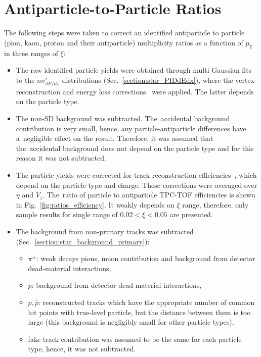 \section{Antiparticle-to-Particle Ratios}\label{section:star_ratios}
The following steps were taken to correct an  identified antiparticle to particle (pion, kaon, proton and their antiparticle) multiplicity ratios as a function of $p_\textrm{T}$ in three ranges of $\xi$:
\begin{itemize}
	\item The raw identified particle yields were obtained through multi-Gaussian fits to the $n\sigma^i_{dE/dx}$ distributions (Sec.~\ref{section:star_PIDdEdx}), where the vertex reconstruction and energy loss corrections~\cite{supplementaryNote} were applied. The latter depends on the particle type.
	\item The non-SD background was subtracted.
	The~accidental background contribution is very small, hence, any particle-antiparticle differences have a~negligible effect on the result. Therefore, 
	 it was assumed that the~accidental background does not depend on the particle type and for this reason it was not subtracted. 
	\item The particle yields were corrected for track reconstruction efficiencies~\cite{supplementaryNote}, which depend on the particle type and charge. These corrections were averaged over $\eta$ and $V_{z}$.
	The~ratio of particle to antiparticle TPC-TOF efficiencies is shown in Fig.~\ref{fig:ratios_efficiency}.  It weakly depends on $\xi$ range, therefore, only sample results for single range of $0.02<\xi<0.05$  are presented.
	\item The background from non-primary tracks was subtracted (Sec.~\ref{section:star_background_primary}):
	\begin{itemize}
		\item $\pi^\pm$: weak decays pions, muon contribution and background from  detector dead-material interactions,
		\item $p$: background from  detector dead-material interactions,
		\item $p,\bar{p}$: reconstructed tracks which have the appropriate number of common hit points with true-level particle, but the distance between them is too large (this background is negligibly small for other particle types),
		\item fake track contribution was assumed to be the same for each particle type, hence, it was not subtracted. 
	\end{itemize}

\end{itemize}
